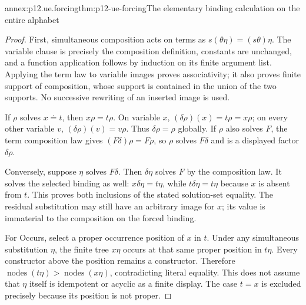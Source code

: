 \begin{annexitem}{annex:p12.ue.forcing}{thm:p12-ue-forcing}{The elementary binding calculation on the entire alphabet}
\begin{proof}
First, simultaneous composition acts on terms as
\(s(\theta\eta)=(s\theta)\eta\). The variable clause is precisely
the composition definition, constants are unchanged, and a function
application follows by induction on its finite argument list. Applying
the term law to variable images proves associativity; it also proves
finite support of composition, whose support is contained in the union
of the two supports. No successive rewriting of an inserted image is used.

If \(\rho\) solves \(x\doteq t\), then
\(x\rho=t\rho\). On variable \(x\), \((\delta\rho)(x)=t\rho=x\rho\);
on every other variable \(v\), \((\delta\rho)(v)=v\rho\).
Thus \(\delta\rho=\rho\) globally. If \(\rho\) also solves \(F\),
the term composition law gives \((F\delta)\rho=F\rho\), so
\(\rho\) solves \(F\delta\) and is a displayed factor \(\delta\rho\).

Conversely, suppose \(\eta\) solves \(F\delta\).
Then \(\delta\eta\) solves \(F\) by the composition law. It solves
the selected binding as well: \(x\delta\eta=t\eta\), while
\(t\delta\eta=t\eta\) because \(x\) is absent from \(t\).
This proves both inclusions of the stated solution-set equality.
The residual substitution may still have an arbitrary image for \(x\);
its value is immaterial to the composition on the forced binding.

For Occurs, select a proper occurrence position of \(x\) in \(t\).
Under any simultaneous substitution \(\eta\), the finite tree
\(x\eta\) occurs at that same proper position in \(t\eta\).
Every constructor above the position remains a constructor. Therefore
\(\operatorname{nodes}(t\eta)>\operatorname{nodes}(x\eta)\),
contradicting literal equality. This does not
assume that \(\eta\) itself is idempotent or acyclic as a finite display.
The case \(t=x\) is excluded precisely because its position is not proper.
\end{proof}
\end{annexitem}

